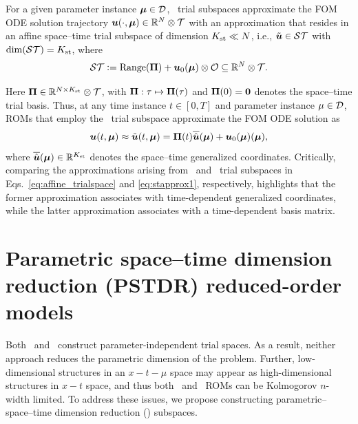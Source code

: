 \documentclass[3p,computermodern,10pt]{elsarticle}
\begin{document}
For a given parameter instance $\boldsymbol \mu \in \mathcal{D}$, \spaceTimeAcronym\ trial subspaces approximate the FOM ODE solution
trajectory
	$\boldsymbol u(\cdot,\boldsymbol \mu) \in\mathbb{R}^{N}\otimes \mathcal{T}$ with an approximation that resides in an
	affine space--time trial subspace of dimension $K_{\text{st}}\ll N$, i.e., 
	$\tilde{\boldsymbol u} \in \mathcal{ST}$ with $\dim(\mathcal{ST}) =K_{\text{st}} $, where
\begin{equation}\label{eq:sttrialspace_def}
 \mathcal{ST} \vcentcolon= 
	\text{Range}(\boldsymbol \Pi) + 
	\boldsymbol u_0(\boldsymbol \mu) \otimes \mathcal{O}
	\subseteq \mathbb{R}^{N} \otimes \mathcal{T}.
\end{equation}

Here $\boldsymbol \Pi \in \mathbb{R}^{N \times K_{\text{st}}} \otimes \mathcal{T}$, with $\boldsymbol \Pi:\tau\mapsto\boldsymbol \Pi(\tau)$ and $\boldsymbol \Pi(0) =
\boldsymbol 0$
denotes the space--time trial basis. 
Thus, at any time instance $t\in[0,T]$ and parameter instance $\mu \in \mathcal{D}$, ROMs that employ the
\spaceTimeAcronym\ trial subspace approximate the FOM ODE solution as
\begin{equation}\label{eq:stapprox1}
 \boldsymbol u(t,\boldsymbol \mu) \approx \tilde{\boldsymbol u}(t,\boldsymbol \mu) = \boldsymbol \Pi(t) \overline{\hat{\boldsymbol u}}(\boldsymbol \mu) + \boldsymbol u_0(\boldsymbol \mu)(\boldsymbol \mu),
\end{equation}
where $ \overline{\hat{\boldsymbol u}}(\boldsymbol \mu) \in \mathbb{R}^{K_{\text{st}}}$ denotes the space--time generalized coordinates. 
Critically, comparing the approximations arising from \spatialAcronym\ and
\spaceTimeAcronym\ trial subspaces in Eqs.~\eqref{eq:affine_trialspace} and \eqref{eq:stapprox1}, respectively,
highlights that the former approximation associates with time-dependent
generalized coordinates, while the latter approximation associates with a
time-dependent basis matrix.





\section{Parametric space--time dimension reduction (PSTDR) reduced-order models}
Both \spatialAcronym\ and \spaceTimeAcronym\ construct parameter-independent trial spaces. As a result, neither approach reduces the parametric dimension of the problem. Further, low-dimensional structures in an $x-t-\mu$ space may appear as high-dimensional structures in $x-t$ space, and thus both \spatialAcronym\ and \spaceTimeAcronym\ ROMs can be Kolmogorov $n$-width limited. To address these issues, we propose constructing parametric--space--time dimension reduction (\parametricSpaceTimeAcronym) subspaces. 
\end{document}
